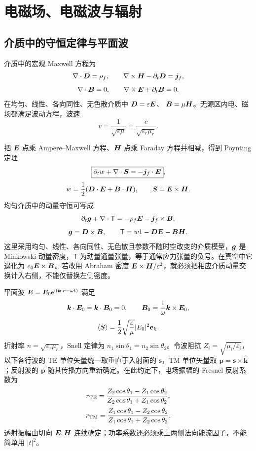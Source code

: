 \section{电磁场、电磁波与辐射}

\subsection{介质中的守恒定律与平面波}

介质中的宏观 Maxwell 方程为
\[
 \nabla\cdot\bm{D}=\rho_f,
 \qquad \nabla\times\bm{H}-\partial_t\bm{D}=\bm{j}_f,
\]
\[
 \nabla\cdot\bm{B}=0,
 \qquad \nabla\times\bm{E}+\partial_t\bm{B}=0.
\]
在均匀、线性、各向同性、无色散介质中
$\bm{D}=\varepsilon\bm{E}$、
$\bm{B}=\mu\bm{H}$。无源区内电、磁场都满足波动方程，波速
\[
 v=\frac1{\sqrt{\varepsilon\mu}}
 =\frac c{\sqrt{\varepsilon_r\mu_r}}.
\]

把 $\bm{E}$ 点乘 Ampere--Maxwell 方程、$\bm{H}$ 点乘 Faraday 方程并相减，得到 Poynting 定理
\[
 \boxed{\partial_tw+\nabla\cdot\bm{S}=-\bm{j}_f\cdot\bm{E}},
\]
\[
 w=\frac12(\bm{D}\cdot\bm{E}+\bm{B}\cdot\bm{H}),
 \qquad \bm{S}=\bm{E}\times\bm{H}.
\]
均匀介质中的动量守恒可写成
\[
 \partial_t\bm{g}+\nabla\cdot\mathsf T
 =-\rho_f\bm{E}-\bm{j}_f\times\bm{B},
\]
\[
 \bm{g}=\bm{D}\times\bm{B},
 \qquad
 \mathsf T=w\mathsf1-\bm{D}\bm{E}-\bm{B}\bm{H}.
\]
这里采用均匀、线性、各向同性、无色散且参数不随时空改变的介质模型，$\bm{g}$ 是 Minkowski 动量密度，$\mathsf T$ 为动量通量张量，等于通常应力张量的负号。在真空中它退化为 $\varepsilon_0\bm{E}\times\bm{B}$。若改用 Abraham 密度 $\bm{E}\times\bm{H}/c^2$，就必须把相应介质动量交换计入右侧，不能仅替换左侧密度。

平面波
$\bm{E}=\bm{E}_0\mathrm e^{\mathrm i(\bm{k}\cdot\bm{r}-\omega t)}$ 满足
\[
 \bm{k}\cdot\bm{E}_0=\bm{k}\cdot\bm{B}_0=0,
 \qquad
 \bm{B}_0=\frac1\omega\bm{k}\times\bm{E}_0,
\]
\[
 \langle\bm{S}\rangle
 =\frac12\sqrt{\frac\varepsilon\mu}|E_0|^2\bm{e}_k.
\]
折射率 $n=\sqrt{\varepsilon_r\mu_r}$，Snell 定律为
$n_1\sin\theta_1=n_2\sin\theta_2$。令波阻抗
$Z_i=\sqrt{\mu_i/\varepsilon_i}$，以下各行波的 TE 单位矢量统一取垂直于入射面的 $\boldsymbol s$，TM 单位矢量取 $\boldsymbol p=\boldsymbol s\times\hat{\boldsymbol k}$；反射波的 $\boldsymbol p$ 随其传播方向重新确定。在此约定下，电场振幅的 Fresnel 反射系数为
\[
 r_{\rm TE}=\frac{Z_2\cos\theta_1-Z_1\cos\theta_2}
 {Z_2\cos\theta_1+Z_1\cos\theta_2},
\]
\[
 r_{\rm TM}=\frac{Z_1\cos\theta_1-Z_2\cos\theta_2}
 {Z_1\cos\theta_1+Z_2\cos\theta_2}.
\]
透射振幅由切向 $\bm{E},\bm{H}$ 连续确定；功率系数还必须乘上两侧法向能流因子，不能简单用 $|t|^2$。

